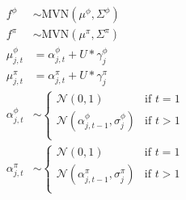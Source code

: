 \documentclass[12pt,letterpaper]{article}
\begin{document}
\begin{equation}
  \begin{aligned}
    f^{\phi} &\sim \text{MVN}(\mu^{\phi}, \Sigma^{\phi}) \\
    f^{\pi} &\sim \text{MVN}(\mu^{\pi}, \Sigma^{\pi}) \\
    \mu^{\phi}_{j, t} &= \alpha^{\phi}_{j, t} + U * \gamma^{\phi}_{j} \\
    \mu^{\pi}_{j, t} &= \alpha^{\pi}_{j, t} + U * \gamma^{\pi}_{j} \\
    \alpha^{\phi}_{j, t} &\sim 
      \begin{cases}
        \mathcal{N}(0, 1) & \text{if } t = 1 \\
        \mathcal{N}(\alpha^{\phi}_{j, t - 1}, \sigma^{\phi}_{j}) & \text{if } t > 1 \\
      \end{cases} \\
    \alpha^{\pi}_{j, t} &\sim 
      \begin{cases}
        \mathcal{N}(0, 1) & \text{if } t = 1 \\
        \mathcal{N}(\alpha^{\pi}_{j, t - 1}, \sigma^{\pi}_{j}) & \text{if } t > 1 \\
      \end{cases} \\
  \end{aligned}
  \label{eq:group}
\end{equation}
\end{document}
